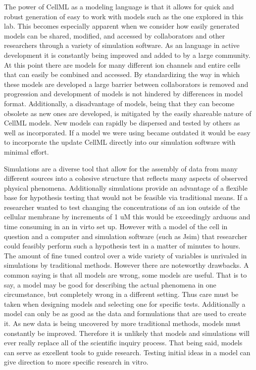 \documentclass[12pt]{article}
\begin{document}
The power of CellML as a modeling language is that it allows for quick and robust generation of easy to work with models such as the one explored in this lab. This becomes especially apparent when we consider how easily generated models can be shared, modified, and accessed by collaborators and other researchers through a variety of simulation software. As an language in active development it is constantly being improved and added to by a large community. At this point there are models for many different ion channels and entire cells that can easily be combined and accessed. By standardizing the way in which these models are developed a large barrier between collaborators is removed and progression and development of models is not hindered by differences in model format. Additionally, a disadvantage of models, being that they can become obsolete as new ones are developed, is mitigated by the easily shareable nature of CellML models. New models can rapidly be dispersed and tested by others as well as incorporated. If a model we were using became outdated it would be easy to incorporate the update CellML directly into our simulation software with minimal effort.
\par{}
Simulations are a diverse tool that allow for the assembly of data from many different sources into a cohesive structure that reflects many aspects of observed physical phenomena. Additionally simulations provide an advantage of a flexible base for hypothesis testing that would not be feasible via traditional means. If a researcher wanted to test changing the concentrations of an ion outside of the cellular membrane by increments of 1 uM this would be exceedingly arduous and time consuming in an in virto set up. However with a model of the cell in question and a computer and simulation software (such as Jsim) that researcher could feasibly perform such a hypothesis test in a matter of minutes to hours. The amount of fine tuned control over a wide variety of variables is unrivaled in simulations by traditional methods. However there are noteworthy drawbacks. A common saying is that all models are wrong, some models are useful. That is to say, a model may be good for describing the actual phenomena in one circumstance, but completely wrong in a different setting. Thus care must be taken when designing models and selecting one for specific tests. Additionally a model can only be as good as the data and formulations that are used to create it. As new data is being uncovered by more traditional methods, models must constantly be improved. Therefore it is unlikely that models and simulations will ever really replace all of the scientific inquiry process. That being said, models can serve as excellent tools to guide research. Testing initial ideas in a model can give direction to more specific research in vitro. 
\end{document}
